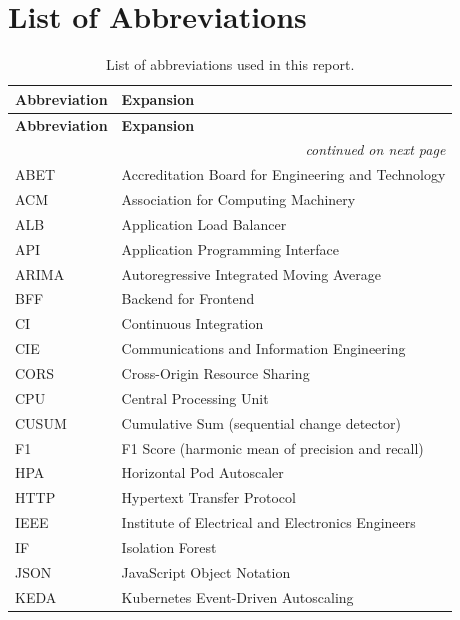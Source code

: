 \chapter*{List of Abbreviations}

\begin{singlespace}
\begin{longtable}{@{}l l@{}}
\caption{List of abbreviations used in this report.}
\label{tab:fm:abbrev} \\
\toprule
\textbf{Abbreviation} & \textbf{Expansion} \\
\midrule
\endfirsthead
\toprule
\textbf{Abbreviation} & \textbf{Expansion} \\
\midrule
\endhead
\midrule
\multicolumn{2}{r}{\small\itshape continued on next page} \\
\endfoot
\bottomrule
\endlastfoot
ABET    & Accreditation Board for Engineering and Technology \\
ACM     & Association for Computing Machinery \\
ALB     & Application Load Balancer \\
API     & Application Programming Interface \\
ARIMA   & Autoregressive Integrated Moving Average \\
BFF     & Backend for Frontend \\
CI      & Continuous Integration \\
CIE     & Communications and Information Engineering \\
CORS    & Cross-Origin Resource Sharing \\
CPU     & Central Processing Unit \\
CUSUM   & Cumulative Sum (sequential change detector) \\
F1      & F1 Score (harmonic mean of precision and recall) \\
HPA     & Horizontal Pod Autoscaler \\
HTTP    & Hypertext Transfer Protocol \\
IEEE    & Institute of Electrical and Electronics Engineers \\
IF      & Isolation Forest \\
JSON    & JavaScript Object Notation \\
KEDA    & Kubernetes Event-Driven Autoscaling \\

\end{longtable}
\end{singlespace}
